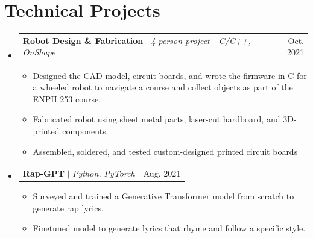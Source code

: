 \documentclass[letterpaper,11pt]{article}
\makeatletter
\newcommand{\resumeItem}[1]{
  \item\small{
    {#1 \vspace{-2pt}}
  }
}
\newcommand{\resumeProjectHeading}[2]{
    \item
    \begin{tabular*}{0.97\textwidth}{l@{\extracolsep{\fill}}r}
      \small#1 & #2 \\
    \end{tabular*}\vspace{-7pt}
}
\newcommand{\resumeSubHeadingListStart}{\begin{itemize}[leftmargin=0.15in, label={}]}
\newcommand{\resumeSubHeadingListEnd}{\end{itemize}}
\newcommand{\resumeItemListStart}{\begin{itemize}}
\newcommand{\resumeItemListEnd}{\end{itemize}\vspace{-5pt}}
\makeatother
\begin{document}
\section{Technical Projects}
    \resumeSubHeadingListStart
      \resumeProjectHeading
          {\textbf{Robot Design \& Fabrication}
          $|$ \emph{4 person project - C/C++, OnShape}
          }{Oct. 2021}
          \resumeItemListStart
            \resumeItem{Designed the CAD model, circuit boards, and wrote the firmware in C for a wheeled robot to navigate a course and collect objects as part of the ENPH 253 course.}
            \resumeItem{Fabricated robot using sheet metal parts, laser-cut hardboard, and 3D-printed components.}
            \resumeItem{Assembled, soldered, and tested custom-designed printed circuit boards}
          \resumeItemListEnd
          
        \resumeProjectHeading
          {\textbf{Rap-GPT}
          $|$ \emph{Python, PyTorch}
          }{Aug. 2021}
          \resumeItemListStart
            \resumeItem{Surveyed and trained a Generative Transformer model from scratch to generate rap lyrics.}
            \resumeItem{Finetuned model to generate lyrics that rhyme and follow a specific style.}
          \resumeItemListEnd
         
    \resumeSubHeadingListEnd
\end{document}
